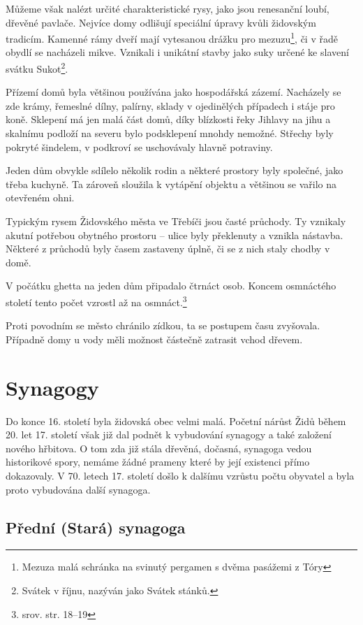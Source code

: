 \documentclass[a4paper,oneside,12pt]{report}
\begin{document}
Můžeme však nalézt určité charakteristické rysy, jako jsou renesanční loubí, dřevěné pavlače.
Nejvíce domy odlišují speciální úpravy kvůli židovským tradicím.
Kamenné rámy dveří mají vytesanou drážku pro mezuzu\footnote{Mezuza malá schránka na svinutý pergamen s dvěma pasážemi z Tóry}, či v řadě obydlí se nacházeli mikve.
Vznikali i unikátní stavby jako suky určené ke slavení svátku Sukot\footnote{Svátek v říjnu, nazýván jako Svátek stánků.}.

Přízemí domů byla většinou používána jako hospodářská zázemí.
Nacházely se zde krámy, řemeslné dílny, palírny, sklady v ojedinělých případech i stáje pro koně.
Sklepení má jen malá část domů, díky blízkosti řeky Jihlavy na jihu a skalnímu podloží na severu bylo podsklepení mnohdy nemožné.
Střechy byly pokryté šindelem, v podkroví se uschovávaly hlavně potraviny.

Jeden dům obvykle sdílelo několik rodin a některé prostory byly společné, jako třeba kuchyně.
Ta zároveň sloužila k vytápění objektu a většinou se vařilo na otevřeném ohni.

Typickým rysem Židovského města ve Třebíči jsou časté průchody.
Ty vznikaly akutní potřebou obytného prostoru -- ulice byly překlenuty a vznikla nástavba.
Některé z průchodů byly časem zastaveny úplně, či se z nich staly chodby v domě.

V počátku ghetta na jeden dům připadalo čtrnáct osob.
Koncem osmnáctého století tento počet vzrostl až na osmnáct.\footnote{srov.  str. 18--19}

Proti povodním se město chránilo zídkou, ta se postupem času zvyšovala.
Případně domy u vody měli možnost částečně zatrasit vchod dřevem.

\section{Synagogy}

Do konce 16. století byla židovská obec velmi malá.
Početní nárůst Židů během 20. let 17. století však již dal podnět k vybudování synagogy a také založení nového hřbitova.
O tom zda již stála dřevěná, dočasná, synagoga vedou historikové spory, nemáme žádné prameny které by její existenci přímo dokazovaly.
V 70. letech 17. století došlo k dalšímu vzrůstu počtu obyvatel a byla proto vybudována další synagoga.

\subsection{Přední (Stará) synagoga}
\end{document}
